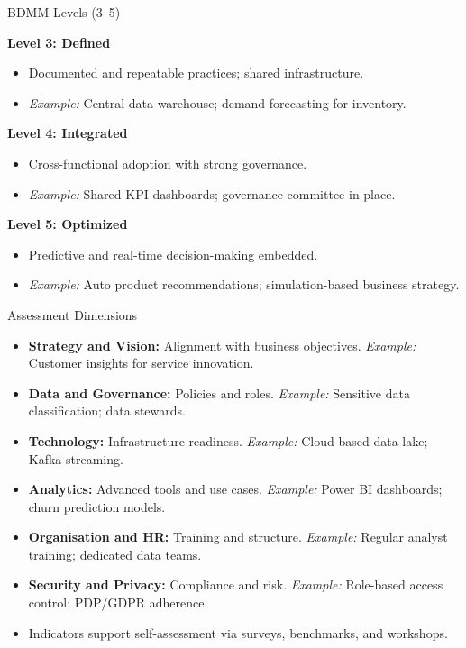 \documentclass[aspectratio=169, table]{beamer}
\begin{document}
	\begin{frame}[fragile]{BDMM Levels (3--5)}
		
		\textbf{Level 3: Defined}
		\begin{itemize}
			\item Documented and repeatable practices; shared infrastructure.
			\item \textit{Example:} Central data warehouse; demand forecasting for inventory.
		\end{itemize}
		
		\textbf{Level 4: Integrated}
		\begin{itemize}
			\item Cross-functional adoption with strong governance.
			\item \textit{Example:} Shared KPI dashboards; governance committee in place.
		\end{itemize}
		
		\textbf{Level 5: Optimized}
		\begin{itemize}
			\item Predictive and real-time decision-making embedded.
			\item \textit{Example:} Auto product recommendations; simulation-based business strategy.
		\end{itemize}
	\end{frame}
	
	\begin{frame}[fragile]{Assessment Dimensions}
		\vspace{18pt}
		\begin{itemize}
			\item \textbf{Strategy and Vision:} Alignment with business objectives. \textit{Example:} Customer insights for service innovation.
			\item \textbf{Data and Governance:} Policies and roles. \textit{Example:} Sensitive data classification; data stewards.
			\item \textbf{Technology:} Infrastructure readiness. \textit{Example:} Cloud-based data lake; Kafka streaming.
			\item \textbf{Analytics:} Advanced tools and use cases. \textit{Example:} Power BI dashboards; churn prediction models.
			\item \textbf{Organisation and HR:} Training and structure. \textit{Example:} Regular analyst training; dedicated data teams.
			\item \textbf{Security and Privacy:} Compliance and risk. \textit{Example:} Role-based access control; PDP/GDPR adherence.
			\item Indicators support self-assessment via surveys, benchmarks, and workshops.
		\end{itemize}
	\end{frame}
\end{document}
